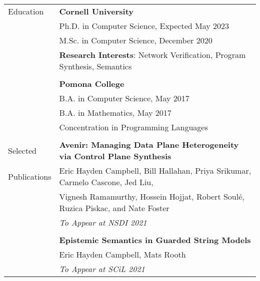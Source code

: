 \documentclass[letterpaper,10pt,oneside]{article}
\begin{document}
\noindent \begin{tabular}{@{} l l}
  \Large{Education} 
    & \textbf{Cornell University} \\
  
    & Ph.D. in Computer Science, Expected May 2023 \\

  
    & M.Sc. in Computer Science, December 2020 \\
  

    & \textbf{Research Interests}: Network Verification, Program Synthesis, Semantics \\
    & \\


    & \textbf{Pomona College} \\

    & B.A. in Computer Science, May 2017 \\

  
    & B.A. in Mathematics, May 2017 \\
  

    & Concentration in Programming Languages \\
    & \\





    \Large{Selected}
       & \textbf{Avenir: Managing Data Plane Heterogeneity via Control Plane Synthesis}\\
   \Large{Publications}
       & Eric Hayden Campbell, Bill Hallahan, Priya Srikumar, Carmelo Cascone, Jed Liu, \\ & Vignesh Ramamurthy, Hossein Hojjat, Robert Soul\'{e}, Ruzica Piskac,  and  Nate Foster\\
            & \textit{To Appear at NSDI 2021} \\

            &\\

    & \textbf{Epistemic Semantics in Guarded String Models}\\
    & Eric Hayden Campbell, Mats Rooth \\
    & \textit{To Appear at SCiL 2021} \\


\end{tabular}
\end{document}
